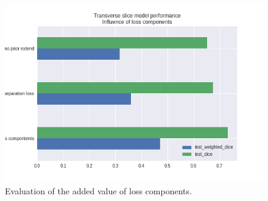 \begin{figure}
    \centering
    \includegraphics[width=.95\textwidth]{images/TransverseModel_Losscomponents.png}
    \caption{Evaluation of the added value of loss components. \label{fig:addedLossComponents}}
\end{figure}

